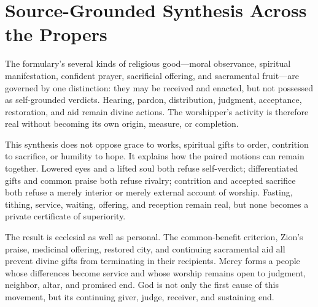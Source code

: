 \sectionguard
\section*{Source-Grounded Synthesis Across the Propers}

The formulary's several kinds of religious good---moral observance, spiritual
manifestation, confident prayer, sacrificial offering, and sacramental
fruit---are governed by one distinction: they may be received and enacted,
but not possessed as self-grounded verdicts. Hearing, pardon, distribution,
judgment, acceptance, restoration, and aid remain divine actions. The
worshipper's activity is therefore real without becoming its own origin,
measure, or completion.

This synthesis does not oppose grace to works, spiritual gifts to order,
contrition to sacrifice, or humility to hope. It explains how the paired
motions can remain together. Lowered eyes and a lifted soul both refuse
self-verdict; differentiated gifts and common praise both refuse rivalry;
contrition and accepted sacrifice both refuse a merely interior or merely
external account of worship. Fasting, tithing, service, waiting, offering, and
reception remain real, but none becomes a private certificate of superiority.

The result is ecclesial as well as personal. The common-benefit criterion,
Zion's praise, medicinal offering, restored city, and continuing sacramental
aid all prevent divine gifts from terminating in their recipients. Mercy
forms a people whose differences become service and whose worship remains
open to judgment, neighbor, altar, and promised end. God is not only the first
cause of this movement, but its continuing giver, judge, receiver, and
sustaining end.
